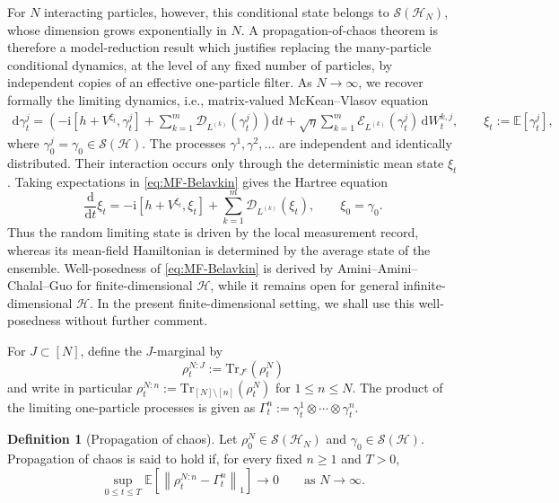 \documentclass[10pt,a4paper,reqno]{amsart}
\numberwithin{equation}{section}
\theoremstyle{plain}
\theoremstyle{definition}
\newtheorem{definition}[theorem]{Definition}
\theoremstyle{remark}
\renewcommand{\d}{\mathrm d}
\renewcommand{\i}{\mathrm i}
\newcommand{\Tr}{\mathrm{Tr}}
\newcommand{\E}{\mathbb E}
\newcommand{\cS}{\mathcal S}
\newcommand{\cD}{\mathcal D}
\newcommand{\cE}{\mathcal E}
\newcommand{\HH}{\mathcal H}
\newcommand{\1}{\mathbf 1}
\begin{document}
\medskip

For $N$ interacting particles, however, this conditional state belongs to
$\cS(\HH_N)$, whose dimension grows exponentially in $N$.  A
propagation-of-chaos theorem is therefore a model-reduction result which justifies
replacing the many-particle conditional dynamics, at the level of any fixed
number of particles, by independent copies of an effective one-particle filter.  As $N\longrightarrow \infty$, we recover formally the limiting dynamics,  i.e.,  matrix-valued McKean--Vlasov equation
\begin{equation}
\begin{aligned}
  \d\gamma_t^j
  =
  \left(
    -\i[h+V^{\xi_t},\gamma_t^j]
    +
    \sum_{k=1}^m
    \cD_{L^{(k)}}(\gamma_t^j)
  \right)\d t+
  \sqrt{\eta}
  \sum_{k=1}^m
  \cE_{L^{(k)}}(\gamma_t^j)\,\d W_t^{k,j},
  \qquad
  \xi_t:=\E[\gamma_t^j],
\end{aligned}
  \label{eq:MF-Belavkin}
\end{equation}
where $ \gamma_0^j=
  \gamma_0\in\cS(\HH)$.  
The processes $\gamma^1,\gamma^2,\ldots$ are independent and identically distributed.  Their interaction
occurs only through the deterministic mean state $\xi_t$.  Taking expectations
in \eqref{eq:MF-Belavkin} gives the Hartree equation 
\begin{equation}
  \frac{\d}{\d t}\xi_t
  =
  -\i[h+V^{\xi_t},\xi_t]
  +
  \sum_{k=1}^m
  \cD_{L^{(k)}}(\xi_t),
  \qquad
  \xi_0=\gamma_0.
  \label{eq:mean-state-equation}
\end{equation}
Thus the random limiting state is driven by the local measurement record,  whereas 
its mean-field Hamiltonian is determined by the average state of the ensemble.  Well-posedness of   \eqref{eq:MF-Belavkin} is derived by 
Amini--Amini--Chalal--Guo
 \cite{Amini2025} for finite-dimensional $\HH$,  while it remains  open  for general infinite-dimensional $\HH$.  In the present finite-dimensional setting,  we shall use this well-posedness without further comment.

\medskip 

For $J\subset [N]$,  define the $J$-marginal by
\[
  \rho_t^{N:J}
  :=
  \Tr_{J^c}(\rho_t^N)
\]
and write in particular 
\(
  \rho_t^{N:n}
  :=
  \Tr_{[N]\setminus[n]}(\rho_t^N)
\) for 
$1\le n\le N$.   The product of the limiting one-particle processes is given as 
\(
  \Gamma_t^n
  :=
  \gamma_t^1\otimes\cdots\otimes\gamma_t^n.
\)

\begin{definition}[Propagation of chaos]
\label{def:propagation-of-chaos}
Let $\rho_0^N\in\cS(\HH_N)$ and $\gamma_0\in\cS(\HH)$.  Propagation of chaos is said to hold if, for every
fixed $n\ge1$ and $T>0$,
\begin{equation}
  \sup_{0\le t\le T}
  \E\left[
    \left\|
      \rho_t^{N:n}-\Gamma_t^n
    \right\|_1
  \right]
  \longrightarrow0
  \qquad
  \text{as }N\longrightarrow \infty.
  \label{eq:propagation-of-chaos}
\end{equation}
\end{definition}
\end{document}
